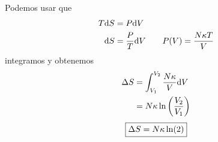 \begin{sol}
\begin{enumerate}
Podemos usar que
\begin{align}
  T\dd S&=P\dd V\\
  \dd S&=\frac{P}{T}\dd V\qquad P(V)=\frac{N\kappa T}{V}
\end{align}
integramos y obtenemos
\begin{align}
  \Delta S&=\int_{V_1}^{V_2}\frac{N\kappa }{V}\dd V\\
  &=N\kappa \ln\left(\frac{V_2}{V_1}\right)
\end{align}
\begin{equation}
\boxed{  \Delta S=N\kappa \ln(2)}
\end{equation}









\end{enumerate}




































\end{sol}